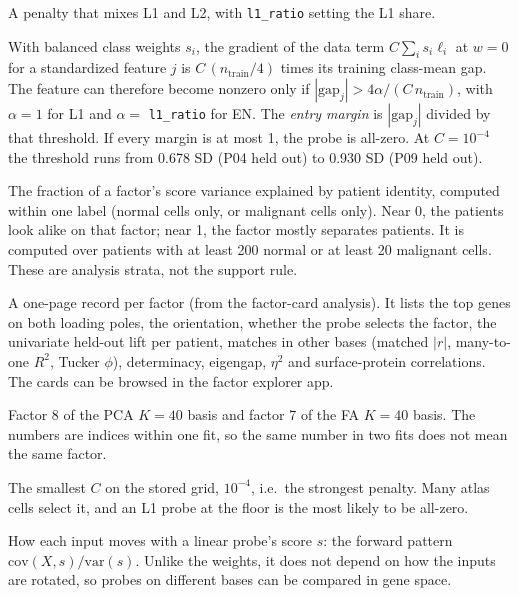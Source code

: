 \begin{description}[leftmargin=0pt,itemsep=3pt,font=\normalfont\bfseries]
\item[Elastic net (EN).] A penalty that mixes L1 and L2, with \texttt{l1\_ratio} setting the L1 share.

\item[Entry threshold, entry margin.] With balanced class weights $s_i$, the gradient of the data term $C\sum_i s_i\ell_i$ at $w=0$ for a standardized feature $j$ is $C\,(n_{\text{train}}/4)$ times its training class-mean gap. The feature can therefore become nonzero only if $|\text{gap}_j|>4\alpha/(C\,n_{\text{train}})$, with $\alpha=1$ for L1 and $\alpha=$ \texttt{l1\_ratio} for EN. The \emph{entry margin} is $|\text{gap}_j|$ divided by that threshold. If every margin is at most 1, the probe is all-zero. At $C=10^{-4}$ the threshold runs from 0.678 SD (P04 held out) to 0.930 SD (P09 held out).

\item[Eta-squared ($\eta^2$).] The fraction of a factor's score variance explained by patient identity, computed within one label (normal cells only, or malignant cells only). Near 0, the patients look alike on that factor; near 1, the factor mostly separates patients. It is computed over patients with at least 200 normal or at least 20 malignant cells. These are analysis strata, not the support rule.

\item[Factor card.] A one-page record per factor (from the factor-card analysis). It lists the top genes on both loading poles, the orientation, whether the probe selects the factor, the univariate held-out lift per patient, matches in other bases (matched $|r|$, many-to-one $R^2$, Tucker $\phi$), determinacy, eigengap, $\eta^2$ and surface-protein correlations. The cards can be browsed in the factor explorer app.

\item[Factor names (PC8, FA7).] Factor 8 of the PCA $K=40$ basis and factor 7 of the FA $K=40$ basis. The numbers are indices within one fit, so the same number in two fits does not mean the same factor.

\item[Grid floor.] The smallest $C$ on the stored grid, $10^{-4}$, i.e.\ the strongest penalty. Many atlas cells select it, and an L1 probe at the floor is the most likely to be all-zero.

\item[Haufe pattern (activation pattern).] How each input moves with a linear probe's score $s$: the forward pattern $\mathrm{cov}(X,s)/\mathrm{var}(s)$. Unlike the weights, it does not depend on how the inputs are rotated, so probes on different bases can be compared in gene space.


\end{description}
